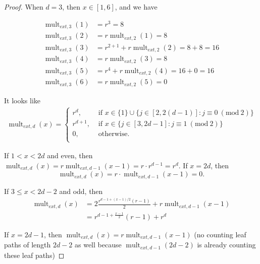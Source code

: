 \documentclass[12]{article}
\newcommand{\Mod}[1]{\ (\mathrm{mod}\ #1)}
\DeclareMathOperator{\mult}{mult}
\theoremstyle{definition}
\begin{document}
\begin{proof}
	When $d=3$, then $x \in [1,6]$, and we have
	
	\begin{align*}
		\mult_{ext,3}(1) &= r^3 = 8	\\
		\mult_{ext,3}(2) &= r \mult_{ext,2}(1) = 8	\\
		\mult_{ext,3}(3) &= r^{2+1} + r \mult_{ext,2}(2) = 8 + 8 = 16	\\
		\mult_{ext,3}(4) &= r \mult_{ext,2}(3) = 8	\\
		\mult_{ext,3}(5) &= r^{4} + r \mult_{ext,2}(4) = 16+0 = 16	\\
		\mult_{ext,3}(6) &= r \mult_{ext,2}(5) = 0
	\end{align*}

It looks like 
\begin{align*}
	\mult_{ext,d}(x) = \begin{cases}
		r^d,	&\text{ if } x \in \{1\} \cup \{j \in [2,2(d-1)]: j \equiv 0 \Mod{2}\}	\\
		r^{d+1},	&\text{ if } x \in \{j \in [3,2d-1]: j \equiv 1 \Mod{2}\}	\\
		0,	&\text{ otherwise. }	\\
	\end{cases}
\end{align*}

If $1 < x < 2d$ and even, then $\mult_{ext,d}(x) = r\mult_{ext,d-1}(x-1) = r \cdot r^{d-1} = r^d$.  If $x = 2d$, then 
$$\mult_{ext,d}(x) = r \cdot \mult_{ext,d-1}(x-1) = 0.$$

If $3 \leq x < 2d-2$ and odd, then 
\begin{align*}
	\mult_{ext,d}(x) &= 2\frac{r^{d-1+(x-1)/2}(r-1)}{2} + r\mult_{ext,d-1}(x-1) 	\\
	&= r^{d-1 + \tfrac{x-1}{2}}(r-1) + r^{d}
\end{align*}

If $x = 2d-1$, then $\mult_{ext,d}(x) = r \mult_{ext,d-1}(x-1)$ (no counting leaf paths of length $2d-2$ as well because $\mult_{ext,d-1}(2d-2)$ is already counting these leaf paths)


\end{proof}
\end{document}
